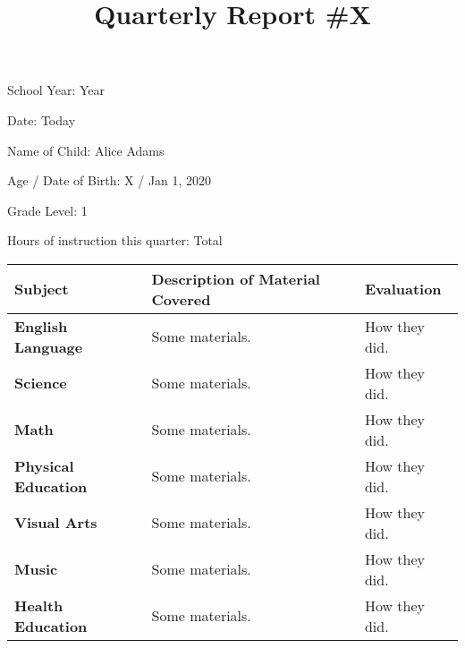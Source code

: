 \documentclass[10pt]{article}
\title{Quarterly Report \#X}
\author{}
\date{}
\begin{document}
\maketitle
\begin{multicols}{2}
  School Year: Year

  Date: Today

  Name of Child: Alice Adams

  Age / Date of Birth: X / Jan 1, 2020

  Grade Level: 1

  Hours of instruction this quarter: Total
\end{multicols}

\noindent\begin{tabularx}{\textwidth}{ |p{2in}|X|X| }

\hline

{\bf Subject} & {\bf Description of Material Covered} & { \bf
  Evaluation } \\

\hline

{\bf English Language} &

Some materials. &

How they did. \\

\hline

{\bf Science}  &

Some materials. &

How they did. \\

\hline

{\bf Math} &

Some materials. &

How they did. \\

\hline

{\bf Physical Education} &

Some materials. &

How they did. \\

\hline

{\bf Visual Arts} &

Some materials. &

How they did. \\

\hline

{\bf Music} &

Some materials. &

How they did. \\

\hline

{\bf Health Education} &

Some materials. &

How they did. \\

\hline

\end{tabularx}
\end{document}
